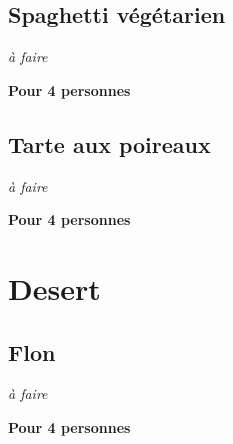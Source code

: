 \documentclass[10pt,a4paper]{report}
\begin{document}
    \section{Spaghetti végétarien}

    \begin{multicols}{2}
        \parbox[1cm]{\textwidth}{
            \begin{description}
                \item \textit{à faire}
            \end{description}
        }
        \columnbreak

        \textbf{Pour 4 personnes}
    \end{multicols}
    \newpage

    \section{Tarte aux poireaux}

    \begin{multicols}{2}
        \parbox[1cm]{\textwidth}{
            \begin{description}
                \item \textit{à faire}
            \end{description}
        }
        \columnbreak

        \textbf{Pour 4 personnes}
    \end{multicols}
    \newpage

    \chapter{Desert}
    \newpage

    \section{Flon}

    \begin{multicols}{2}
        \parbox[1cm]{\textwidth}{
            \begin{description}
                \item \textit{à faire}
            \end{description}
        }
        \columnbreak

        \textbf{Pour 4 personnes}
    \end{multicols}
    \newpage
\end{document}
